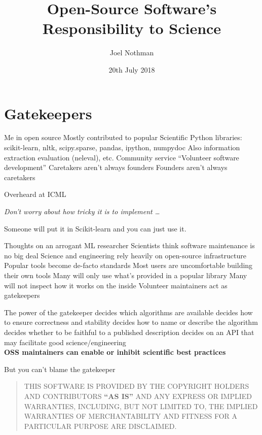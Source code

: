 \documentclass[aspectratio=169, 22pt]{beamer}
\title{Open-Source Software's Responsibility to Science}
\subtitle{}
\date{20th July 2018}
\author{Joel Nothman}
\newcommand{\hl}{\textcolor{usydred}}
\begin{document}
\titleslide

\section{Gatekeepers}

\begin{points}{Me in open source}
	\p Mostly contributed to popular Scientific Python libraries:\\
	scikit-learn, nltk, scipy.sparse, pandas, ipython, numpydoc
	\p Also information extraction evaluation (neleval), etc.
	\vfill
	\p Community service
	\p ``Volunteer software development''
	\vfill
	\p Caretakers aren't always founders
	\p Founders aren't always caretakers
\end{points}

\begin{centre}{Overheard at ICML}
	\parbox{\textwidth}{
		\Large
		\it
	Don't worry about how tricky it is to implement \ldots

	\vspace{2em}

	\raggedleft Someone will put it in Scikit-learn and you can just use it.
	}
\end{centre}

\begin{points}{Thoughts on an arrogant ML researcher}
	\p Scientists think software maintenance is no big deal
	\pause
	\p Science and engineering rely heavily on open-source infrastructure
	\p Popular tools become de-facto standards
	\vfill
	\p Most users are uncomfortable building their own tools
	\p Many will only use what's provided in a popular library
	\p Many will not inspect how it works on the inside
	\vfill
	\p Volunteer maintainers act as gatekeepers
\end{points}

\begin{points}{The power of the gatekeeper}
	\p decides \hl{which algorithms} are available
	\p decides how to ensure \hl{correctness} and stability
	\p decides how to \hl{name} or describe the algorithm
	\p decides whether to be \hl{faithful} to a published description
	\p decides on an \hl{API} that may facilitate good science/engineering
	\\
	\pause
	\vspace{2em}
	\hl{\bf OSS maintainers can enable or inhibit scientific best practices}
\end{points}

\begin{centre}{But you can't blame the gatekeeper}
	\begin{quote}
	THIS SOFTWARE IS PROVIDED BY THE COPYRIGHT HOLDERS AND CONTRIBUTORS \textbf{``AS IS''}
	AND ANY EXPRESS OR IMPLIED WARRANTIES, INCLUDING, BUT NOT LIMITED TO, THE
	IMPLIED WARRANTIES OF MERCHANTABILITY AND FITNESS FOR A PARTICULAR PURPOSE
	ARE DISCLAIMED.
	\end{quote}
\end{centre}
\end{document}
